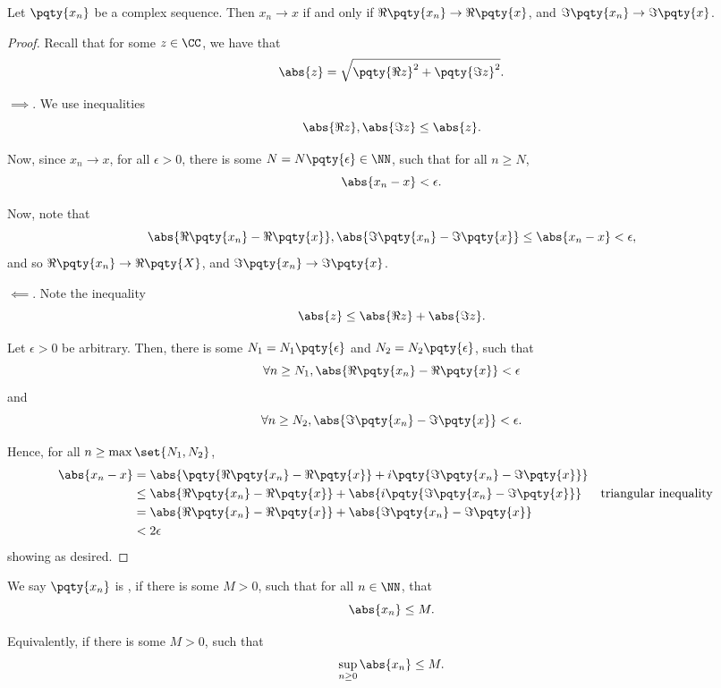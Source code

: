 \begin{lemma}
    \label{lem:seq-convergence-in-c}%
    Let \(\pqty{x_n}\) be a complex sequence. Then \(x_n \to x\) if and only if \(\Re\pqty{x_n} \to \Re\pqty{x}\), and \(\Im \pqty{x_n} \to \Im\pqty{x}\).
\end{lemma}

\begin{proof}
    Recall that for some \(z \in \CC\), we have that
    \[
        \abs{z} = \sqrt{\pqty{\Re z}^2 + \pqty{\Im z}^2}.
    \]
    
    \(\implies\). We use inequalities
    \[
        \abs{\Re z}, \abs{\Im z} \leq \abs{z}.
    \]

    Now, since \(x_n \to x\), for all \(\epsilon > 0\), there is some \(N = N\pqty{\epsilon} \in \NN\), such that for all \(n \geq N\),
    \[
        \abs{x_n - x} < \epsilon.
    \]

    Now, note that
    \[
        \abs{\Re\pqty{x_n} - \Re\pqty{x}}, \abs{\Im\pqty{x_n} - \Im\pqty{x}} \leq \abs{x_n - x} < \epsilon,
    \]
    and so \(\Re\pqty{x_n} \to \Re\pqty{X}\), and \(\Im\pqty{x_n} \to \Im\pqty{x}\).

    \(\impliedby\). Note the inequality
    \[
        \abs{z} \leq \abs{\Re z} + \abs{\Im z}.
    \]

    Let \(\epsilon > 0\) be arbitrary. Then, there is some \(N_1 = N_1 \pqty{\epsilon}\) and \(N_2 = N_2 \pqty{\epsilon}\), such that
    \[
        \forall n \geq N_1, \abs{\Re\pqty{x_n} - \Re\pqty{x}} < \epsilon
    \]
    and
    \[
        \forall n \geq N_2, \abs{\Im\pqty{x_n} - \Im\pqty{x}} < \epsilon.
    \]

    Hence, for all \(n \geq \max\set{N_1, N_2}\),
    \begin{align*}
        \abs{x_n - x} &= \abs{\pqty{\Re \pqty{x_n} - \Re \pqty{x}} + i \pqty{\Im \pqty{x_n} - \Im \pqty{x}}} \\
        &\leq \abs{\Re\pqty{x_n} - \Re\pqty{x}} + \abs{i\pqty{\Im\pqty{x_n} - \Im\pqty{x}}} && \text{triangular inequality} \\
        &= \abs{\Re\pqty{x_n} - \Re\pqty{x}} + \abs{\Im\pqty{x_n} - \Im\pqty{x}} \\
        &< 2\epsilon
    \end{align*}
    showing as desired.
\end{proof}

\begin{definition}
    \label{def:seq-bounded}%
    We say \(\pqty{x_n}\) is , if there is some \(M > 0\), such that for all \(n \in \NN\), that
    \[
        \abs{x_n} \leq M.
    \]

    Equivalently, if there is some \(M > 0\), such that
    \[
        \sup_{n \geq 0} \abs{x_n} \leq M.
    \]
\end{definition}

